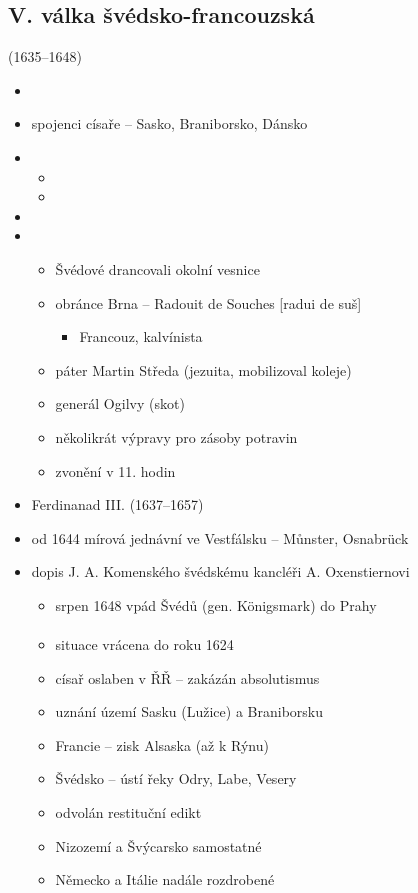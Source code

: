 \subsection{V. válka švédsko-francouzská} (1635--1648)
\begin{itemize}
\item {}
\item spojenci císaře -- Sasko, Braniborsko, Dánsko
\item {}
	\begin{itemize}
	\item {}
	\item {}
	\end{itemize}
\item {}
\item {}
	\begin{itemize}
	\item Švédové drancovali okolní vesnice
	\item obránce Brna -- Radouit de Souches [radui de suš]
		\begin{itemize}
		\item Francouz, kalvínista
		\end{itemize}
	\item páter Martin Středa (jezuita, mobilizoval koleje)
	\item generál Ogilvy (skot)
	\item několikrát výpravy pro zásoby potravin
	\item zvonění v 11. hodin
	\end{itemize}
\item Ferdinanad III. (1637--1657)
\item od 1644 mírová jednávní ve Vestfálsku -- Můnster, Osnabrück
\item dopis J. A. Komenského švédskému kancléři A. Oxenstiernovi
	\begin{itemize}
	\item srpen 1648 vpád Švédů (gen. Königsmark) do Prahy
	\end{itemize}

\paragraph{}
\begin{itemize}
\item situace vrácena do roku 1624
\item císař oslaben v ŘŘ -- zakázán absolutismus
\item uznání území Sasku (Lužice) a Braniborsku
\item Francie -- zisk Alsaska (až k Rýnu)
\item Švédsko -- ústí řeky Odry, Labe, Vesery
\item odvolán restituční edikt
\item Nizozemí a Švýcarsko samostatné
\item Německo a Itálie nadále rozdrobené
\end{itemize}


\end{itemize}
